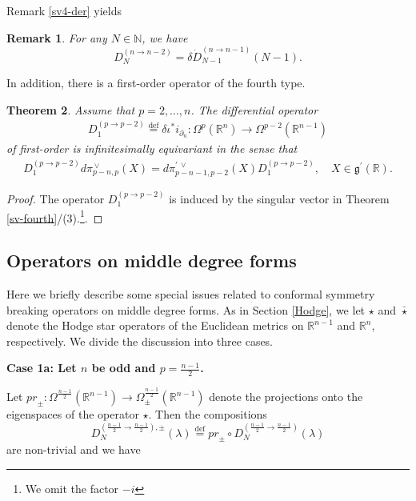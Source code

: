 \documentclass[a4paper,12pt,reqno]{amsart}
\newtheorem{theorem}{Theorem}
\newtheorem{bem}[theorem]{Remark}
\numberwithin{theorem}{subsection}
\numberwithin{equation}{section}
\begin{document}
Remark \ref{sv4-der} yields

\begin{bem}\label{D4-dot} For any $N \in {\mathbb{N}}$, we have
$$
   D_N^{(n \to n-2)} = \delta \dot{D}_{N-1}^{(n \to n-1)}(N\!-\!1).
$$
\end{bem}

In addition, there is a first-order operator of the fourth type.

\begin{theorem}\label{DO4-FO} Assume that $p=2,\dots,n$. The differential operator
\begin{align*}
   D_1^{(p\to p-2)} {\stackrel{\text{def}}{=}} \delta \iota^*i_{\partial_n}: \Omega^p({\mathbb{R}}^n)\to \Omega^{p-2}({\mathbb{R}}^{n-1})
\end{align*}
of first-order is infinitesimally equivariant in the sense that
\begin{align*}
   D_{1}^{(p\to p-2)}{d}\pi^{{\,\vee}}_{p-n,p}(X)
   = {d}\pi^{\prime{{\,\vee}}}_{p-n-1,p-2}(X) D^{(p\to p-2)}_{1}, \quad X\in{{\mathfrak g}}^\prime({\mathbb{R}}).
\end{align*}
\end{theorem}

\begin{proof} The operator $D_{1}^{(p\to p-2)}$ is induced by the singular vector in Theorem
\ref{sv-fourth}/(3).\footnote{We omit the factor $-i$}.
\end{proof}

\subsection{Operators on middle degree forms}\label{CSBO-middle}

Here we briefly describe some special issues related to conformal symmetry
breaking operators on middle degree forms. As in Section \ref{Hodge}, we let
$\star$ and $\bar{\star}$ denote the Hodge star operators of the Euclidean
metrics on ${\mathbb{R}}^{n-1}$ and ${\mathbb{R}}^n$, respectively. We divide the discussion into
three cases.

{\bf Case 1a: Let $n$ be odd and $p=\frac{n-1}{2}$.}

Let ${pr}_{\pm}: \Omega^{\frac{n-1}{2}}({\mathbb{R}}^{n-1}) \to
\Omega^{\frac{n-1}{2}}_{\pm}({\mathbb{R}}^{n-1})$ denote the projections onto the eigenspaces
of the operator $\star$. Then the compositions
\begin{equation*}
   D^{(\frac{n-1}{2}\to \frac{n-1}{2}),{\pm}}_N(\lambda) {\stackrel{\text{def}}{=}}
   {pr}_\pm \circ D^{(\frac{n-1}{2}\to \frac{n-1}{2})}_N(\lambda)
\end{equation*}
are non-trivial and we have
\end{document}

